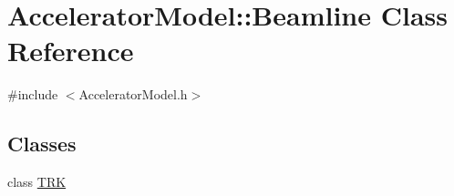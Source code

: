 \hypertarget{classAcceleratorModel_1_1Beamline}{}\section{Accelerator\+Model\+:\+:Beamline Class Reference}
\label{classAcceleratorModel_1_1Beamline}


{\ttfamily \#include $<$Accelerator\+Model.\+h$>$}

\subsection*{Classes}
\begin{DoxyCompactItemize}
\item 
class \hyperlink{classAcceleratorModel_1_1Beamline_1_1TRK}{T\+RK}
\end{DoxyCompactItemize}
